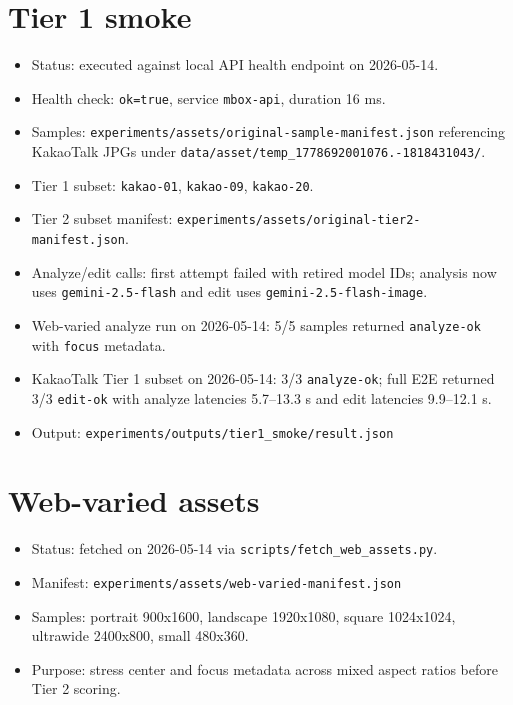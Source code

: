 \documentclass{article}
\begin{document}
\section{Tier 1 smoke}
\begin{itemize}
  \item Status: executed against local API health endpoint on 2026-05-14.
  \item Health check: \texttt{ok=true}, service \texttt{mbox-api}, duration 16 ms.
  \item Samples: \texttt{experiments/assets/original-sample-manifest.json} referencing KakaoTalk JPGs under \texttt{data/asset/temp\_1778692001076.-1818431043/}.
  \item Tier 1 subset: \texttt{kakao-01}, \texttt{kakao-09}, \texttt{kakao-20}.
  \item Tier 2 subset manifest: \texttt{experiments/assets/original-tier2-manifest.json}.
  \item Analyze/edit calls: first attempt failed with retired model IDs; analysis now uses \texttt{gemini-2.5-flash} and edit uses \texttt{gemini-2.5-flash-image}.
  \item Web-varied analyze run on 2026-05-14: 5/5 samples returned \texttt{analyze-ok} with \texttt{focus} metadata.
  \item KakaoTalk Tier 1 subset on 2026-05-14: 3/3 \texttt{analyze-ok}; full E2E returned 3/3 \texttt{edit-ok} with analyze latencies 5.7--13.3 s and edit latencies 9.9--12.1 s.
  \item Output: \texttt{experiments/outputs/tier1\_smoke/result.json}
\end{itemize}

\section{Web-varied assets}
\begin{itemize}
  \item Status: fetched on 2026-05-14 via \texttt{scripts/fetch\_web\_assets.py}.
  \item Manifest: \texttt{experiments/assets/web-varied-manifest.json}
  \item Samples: portrait 900x1600, landscape 1920x1080, square 1024x1024, ultrawide 2400x800, small 480x360.
  \item Purpose: stress center and focus metadata across mixed aspect ratios before Tier 2 scoring.
\end{itemize}
\end{document}

